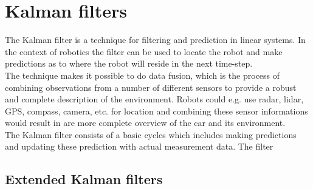 
\section{Kalman filters}

The Kalman filter is a technique for filtering and prediction in linear systems. In the context of robotics the filter can be used to locate the robot and make predictions as to where the robot will reside in the next time-step.\\

The technique makes it possible to do data fusion, which is the process of combining observations from a number of different sensors to provide a robust and complete description of the environment. Robots could e.g. use radar, lidar, GPS, compass, camera, etc. for location and combining these sensor informations would result in are more complete overview of the car and its environment.\\

The Kalman filter consists of a basic cycles which includes making predictions and updating these prediction with actual measurement data. The filter 

\subsection{Extended Kalman filters}